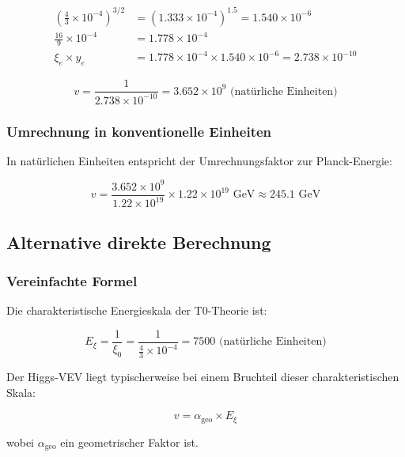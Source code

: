 \documentclass[12pt,a4paper]{article}
\theoremstyle{definition}
\begin{document}
\begin{align}
	\left(\frac{4}{3} \times 10^{-4}\right)^{3/2} &= (1.333 \times 10^{-4})^{1.5} = 1.540 \times 10^{-6}\\
	\frac{16}{9} \times 10^{-4} &= 1.778 \times 10^{-4}\\
	\xi_e \times y_e &= 1.778 \times 10^{-4} \times 1.540 \times 10^{-6} = 2.738 \times 10^{-10}
\end{align}

\begin{equation}
	v = \frac{1}{2.738 \times 10^{-10}} = 3.652 \times 10^9 \text{ (nat{\"u}rliche Einheiten)}
\end{equation}

\subsubsection{Umrechnung in konventionelle Einheiten}

In nat{\"u}rlichen Einheiten entspricht der Umrechnungsfaktor zur Planck-Energie:

\begin{equation}
	v = \frac{3.652 \times 10^9}{1.22 \times 10^{19}} \times 1.22 \times 10^{19} \text{ GeV} \approx 245.1 \text{ GeV}
\end{equation}

\subsection{Alternative direkte Berechnung}

\subsubsection{Vereinfachte Formel}

Die charakteristische Energieskala der T0-Theorie ist:

\begin{equation}
	E_\xi = \frac{1}{\xi_0} = \frac{1}{\frac{4}{3} \times 10^{-4}} = 7500 \text{ (nat{\"u}rliche Einheiten)}
\end{equation}

Der Higgs-VEV liegt typischerweise bei einem Bruchteil dieser charakteristischen Skala:

\begin{equation}
	v = \alpha_{\text{geo}} \times E_\xi
\end{equation}

wobei $\alpha_{\text{geo}}$ ein geometrischer Faktor ist.
\end{document}
